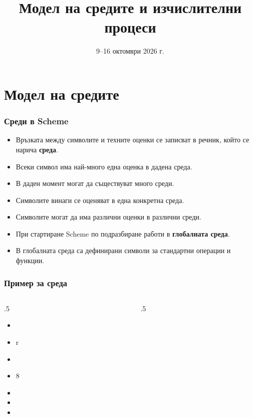 \documentclass[alsotrans,beameroptions={aspectratio=169}]{beamerswitch}
\title[Среди и процеси]{Модел на средите и изчислителни процеси}
\date{9--16 октомври 2026 г.}
\begin{document}
\begin{frame}
  \titlepage
\end{frame}

\section{Модел на средите}

\begin{frame}
  \frametitle{Среди в Scheme}

  \begin{itemize}[<+->]
  \item Връзката между символите и техните оценки се записват в речник, който се нарича \textbf{среда}.
  \item Всеки символ има най-много една оценка в дадена среда.
  \item В даден момент могат да съществуват много среди.
  \item Символите винаги се оценяват в една конкретна среда.
  \item \alert{Символите могат да има различни оценки в различни среди.}
  \item При стартиране Scheme по подразбиране работи в \textbf{глобалната среда}.
  \item В глобалната среда са дефинирани символи за стандартни операции и функции.
  \end{itemize}
\end{frame}

\begin{frame}
  \frametitle{Пример за среда}

  \begin{columns}[T,onlytextwidth]
    \begin{column}{.5\textwidth}
      \begin{itemize}[<+->]
      \item {}
      \item \evalstoerr r
      \item {}
      \item {}8
      \item {}
      \item {}
      \item {}
      \end{itemize}
    \end{column}

    \begin{column}{.5\textwidth}
    \end{column}
  \end{columns}
\end{frame}
\end{document}
